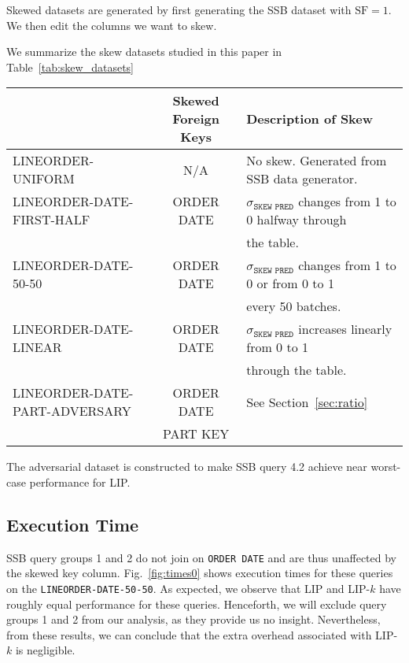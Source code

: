 Skewed datasets are generated by first generating the SSB dataset with $\text{SF} = 1$.
We then edit the columns we want to skew. 



We summarize the skew datasets studied in this paper in Table~\ref{tab:skew_datasets}

\begin{center}
\begin{tabular}{ |>{\ttfamily}l|>{\ttfamily}c|l| } 
\hline
{\bf Dataset Name} & {\bf Skewed Foreign Keys} & {\bf Description of Skew} \\
\hline
\hline
LINEORDER-UNIFORM& N/A & No skew. Generated from SSB data generator.\\
\hline
LINEORDER-DATE-FIRST-HALF& ORDER DATE & $\sigma_{\texttt{SKEW PRED}}$ changes from 1 to 0 halfway through\\
& &  the table.\\
\hline
LINEORDER-DATE-50-50& ORDER DATE & $\sigma_{\texttt{SKEW PRED}}$ changes from 1 to 0 or from 0 to 1 \\
& & every 50 batches. \\ 
\hline
LINEORDER-DATE-LINEAR& ORDER DATE & $\sigma_{\texttt{SKEW PRED}}$ increases linearly from 0 to 1 \\
& & through the table. \\
\hline
LINEORDER-DATE-PART-ADVERSARY& ORDER DATE & See Section~\ref{sec:ratio}\\
& PART KEY & \\
\hline
\end{tabular}
\end{center}

The adversarial dataset is constructed to make SSB query 4.2 achieve near worst-case performance for LIP. 


\subsection{Execution Time}
\label{sec:time}



SSB query groups 1 and 2 do not join on \texttt{ORDER DATE} and are thus unaffected by the skewed key column. 
Fig.~\ref{fig:times0} shows execution times for these queries on the \texttt{LINEORDER-DATE-50-50}.
As expected, we observe that LIP and LIP-$k$ have roughly equal performance for these queries.
Henceforth, we will exclude query groups 1 and 2 from our analysis, 
as they provide us no insight. 
Nevertheless, from these results, we can conclude that the extra overhead associated with LIP-$k$ is negligible.



